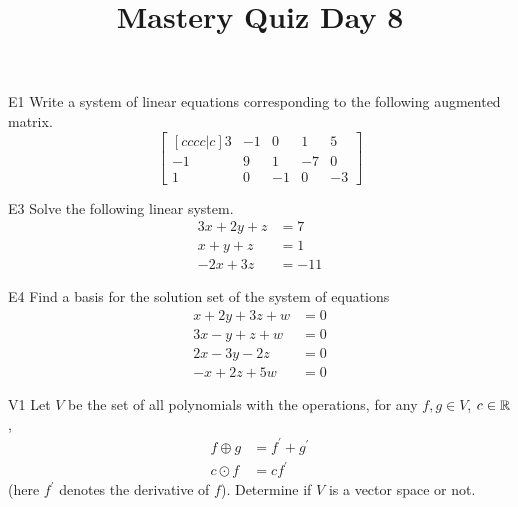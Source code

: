 \documentclass{sbgLAquiz}
\title{Mastery Quiz Day 8 }
\begin{document}
\begin{problem}{E1}
Write a system of linear equations corresponding to the following
augmented matrix.
\[
\begin{bmatrix}[cccc|c]
3 & -1 & 0 & 1 & 5 \\
-1 & 9 & 1 & -7 & 0 \\
1 & 0 & -1 & 0 & -3
\end{bmatrix}
\]
\end{problem}

\begin{problem}{E3}
Solve the following linear system.
\begin{align*}
3x+2y+z &= 7 \\
x+y+z &= 1 \\
-2x+3z &= -11
\end{align*}
\end{problem}
\newpage

\begin{problem}{E4}
Find a basis for the solution set of the system of equations
\begin{align*}
x+2y+3z+w &= 0 \\
3x-y+z+w &= 0 \\
2x-3y-2z &= 0 \\
-x+2z+5w &=0
\end{align*}
\end{problem}

\begin{problem}{V1}
Let $V$ be the set of all polynomials with the operations, for any $f, g \in V$, $c \in \mathbb{R}$,
\begin{align*}
f \oplus g &= f^\prime + g^\prime \\
c \odot f &= c f^\prime
\end{align*}
(here $f^\prime$ denotes the derivative of $f$).  Determine if $V$ is a vector space or not.
\end{problem}
\end{document}
